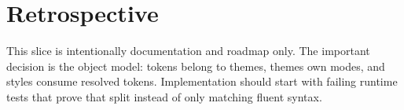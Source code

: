 \section{Retrospective}\label{record-178-retrospective}

This slice is intentionally documentation and roadmap only. The important decision is the object model: tokens belong to themes, themes own modes, and styles consume resolved tokens. Implementation should start with failing runtime tests that prove that split instead of only matching fluent syntax.

